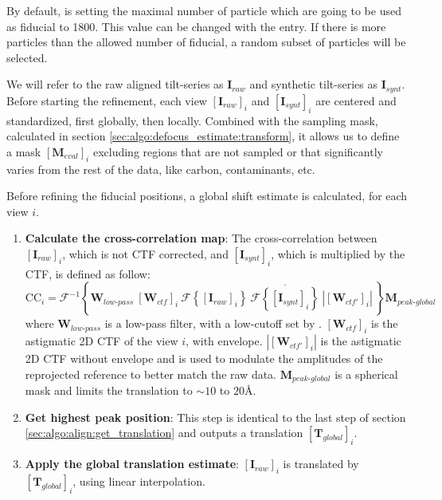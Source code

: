 By default, {\emClarity} is setting the maximal number of particle which are going to be used as fiducial to 1800. This value can be changed with the  entry. If there is more particles than the allowed number of fiducial, a random subset of particles will be selected.

We will refer to the raw aligned tilt-series as $\bm{I}_{raw}$ and synthetic tilt-series as $\bm{I}_{synt}$. Before starting the refinement, each view ${[\bm{I}_{raw}]}_i$ and ${[\bm{I}_{synt}]}_i$ are centered and standardized, first globally, then locally. Combined with the sampling mask, calculated in section \ref{sec:algo:defocus_estimate:transform}, it allows us to define a mask ${[\bm{M}_{eval}]}_i$ excluding regions that are not sampled or that significantly varies from the rest of the data, like carbon, contaminants, etc.

Before refining the fiducial positions, a global shift estimate is calculated, for each view $i$.
\begin{enumerate}
    \item \textbf{Calculate the cross-correlation map}: The cross-correlation between ${[\bm{I}_{raw}]}_i$, which is not CTF corrected, and ${[\bm{I}_{synt}]}_i$, which is multiplied by the CTF, is defined as follow:
    \begin{equation}
        \bm{\mathrm{CC}}_{i} = \mathcal{F}^{-1} \left\{ \bm{W}_{low\text{-}pass}\ {[\bm{W}_{ctf}]}_i\ \mathcal{F}\left\{ {[\bm{I}_{raw}]}_i \right\}\ \overline{\mathcal{F}\left\{ {[\bm{I}_{synt}]}_i \right\}}\ \left|{[\bm{W}_{ctf'}]}_i\right|\ \right\} \bm{M}_{peak\text{-}global}
    \end{equation}
    where $\bm{W}_{low\text{-}pass}$ is a low-pass filter, with a low-cutoff set by . ${[\bm{W}_{ctf}]}_i$ is the astigmatic 2D CTF of the view $i$, with envelope. $|{[\bm{W}_{ctf'}]}_i|$ is the astigmatic 2D CTF without envelope and is used to modulate the amplitudes of the reprojected reference to better match the raw data. $\bm{M}_{peak\text{-}global}$ is a spherical mask and limits the translation to $\sim 10$ to $20$\r{A}.
    
    \item \textbf{Get highest peak position}: This step is identical to the last step of section \ref{sec:algo:align:get_translation} and outputs a translation ${[\bm{T}_{global}]}_i$.
    
    \item \textbf{Apply the global translation estimate}: ${[\bm{I}_{raw}]}_i$ is translated by ${[\bm{T}_{global}]}_i$, using linear interpolation.
\end{enumerate}

